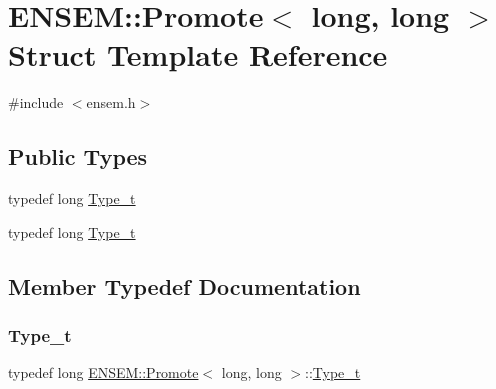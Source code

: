 \hypertarget{structENSEM_1_1Promote_3_01long_00_01long_01_4}{}\section{E\+N\+S\+EM\+:\+:Promote$<$ long, long $>$ Struct Template Reference}
\label{structENSEM_1_1Promote_3_01long_00_01long_01_4}


{\ttfamily \#include $<$ensem.\+h$>$}

\subsection*{Public Types}
\begin{DoxyCompactItemize}
\item 
typedef long \mbox{\hyperlink{structENSEM_1_1Promote_3_01long_00_01long_01_4_aa01e24c09d90acda8fe0fb2f606bde86}{Type\+\_\+t}}
\item 
typedef long \mbox{\hyperlink{structENSEM_1_1Promote_3_01long_00_01long_01_4_aa01e24c09d90acda8fe0fb2f606bde86}{Type\+\_\+t}}
\end{DoxyCompactItemize}


\subsection{Member Typedef Documentation}
\mbox{\label{structENSEM_1_1Promote_3_01long_00_01long_01_4_aa01e24c09d90acda8fe0fb2f606bde86}} 
\subsubsection{\texorpdfstring{Type\_t}{Type\_t}\hspace{0.1cm}{\footnotesize\ttfamily [1/2]}}
{\footnotesize\ttfamily typedef long \mbox{\hyperlink{structENSEM_1_1Promote}{E\+N\+S\+E\+M\+::\+Promote}}$<$ long, long $>$\+::\mbox{\hyperlink{structENSEM_1_1Promote_3_01long_00_01long_01_4_aa01e24c09d90acda8fe0fb2f606bde86}{Type\+\_\+t}}}

\mbox{\label{structENSEM_1_1Promote_3_01long_00_01long_01_4_aa01e24c09d90acda8fe0fb2f606bde86}} 

